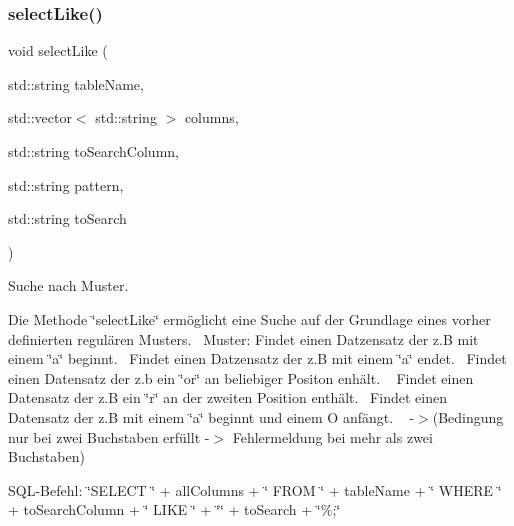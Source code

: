 \subsubsection{select\+Like()}
{\footnotesize\ttfamily void select\+Like (\begin{DoxyParamCaption}\item[{std\+::string}]{table\+Name,  }\item[{std\+::vector$<$ std\+::string $>$}]{columns,  }\item[{std\+::string}]{to\+Search\+Column,  }\item[{std\+::string}]{pattern,  }\item[{std\+::string}]{to\+Search }\end{DoxyParamCaption})}



Suche nach Muster. 

Die Methode \char`\"{}select\+Like\char`\"{} ermöglicht eine Suche auf der Grundlage eines vorher definierten regulären Musters.~\newline
 Muster\+: Findet einen Datzensatz der z.\+B mit einem \char`\"{}a\char`\"{} beginnt.~\newline
 Findet einen Datzensatz der z.\+B mit einem \char`\"{}a\char`\"{} endet.~\newline
 Findet einen Datensatz der z.\+b ein \char`\"{}or\char`\"{} an beliebiger Positon enhält. ~\newline
 Findet einen Datensatz der z.\+B ein \char`\"{}r\char`\"{} an der zweiten Position enthält.~\newline
 Findet einen Datensatz der z.\+B mit einem \char`\"{}a\char`\"{} beginnt und einem O anfängt. ~\newline
 -\/$>$(Bedingung nur bei zwei Buchstaben erfüllt -\/$>$ Fehlermeldung bei mehr als zwei Buchstaben)~\newline


S\+Q\+L-\/\+Befehl\+: \char`\"{}\+S\+E\+L\+E\+C\+T \char`\"{} + all\+Columns + \char`\"{} F\+R\+O\+M \char`\"{} + table\+Name + \char`\"{} W\+H\+E\+R\+E \char`\"{} + to\+Search\+Column + \char`\"{}  L\+I\+K\+E \char`\"{} + \char`\"{}\textquotesingle{}\char`\"{} + to\+Search + \char`\"{}\%\textquotesingle{};\char`\"{}



